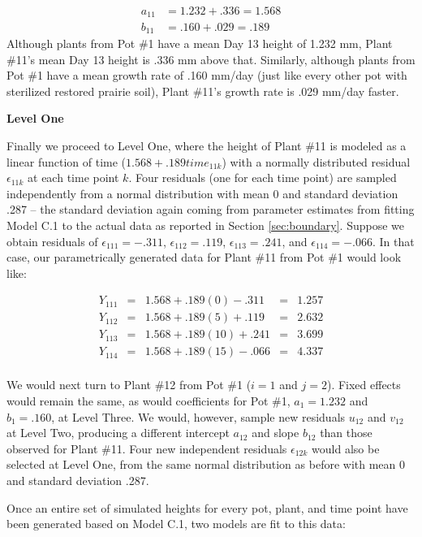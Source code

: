 \documentclass[
]{krantz}
\begin{document}
\begin{align*}
a_{11} & = 1.232+.336 = 1.568 \\
b_{11} & = .160+.029 = .189
\end{align*}
Although plants from Pot \#1 have a mean Day 13 height of 1.232 mm, Plant \#11's mean Day 13 height is .336 mm above that. Similarly, although plants from Pot \#1 have a mean growth rate of .160 mm/day (just like every other pot with sterilized restored prairie soil), Plant \#11's growth rate is .029 mm/day faster.

\textbf{Level One}

Finally we proceed to Level One, where the height of Plant \#11 is modeled as a linear function of time (\(1.568 + .189\textstyle{time}_{11k}\)) with a normally distributed residual \(\epsilon_{11k}\) at each time point \(k\). Four residuals (one for each time point) are sampled independently from a normal distribution with mean 0 and standard deviation .287 -- the standard deviation again coming from parameter estimates from fitting Model C.1 to the actual data as reported in Section \ref{sec:boundary}. Suppose we obtain residuals of \(\epsilon_{111}=-.311\), \(\epsilon_{112}=.119\), \(\epsilon_{113}=.241\), and \(\epsilon_{114}=-.066\). In that case, our parametrically generated data for Plant \#11 from Pot \#1 would look like:

\[ \begin{array}{rcccl}
   Y_{111} & = & 1.568+.189(0)-.311 & = & 1.257 \\
   Y_{112} & = & 1.568+.189(5)+.119 & = & 2.632 \\
   Y_{113} & = & 1.568+.189(10)+.241 & = & 3.699 \\
   Y_{114} & = & 1.568+.189(15)-.066 & = & 4.337 \\
   \end{array} \]

We would next turn to Plant \#12 from Pot \#1 (\(i=1\) and \(j=2\)). Fixed effects would remain the same, as would coefficients for Pot \#1, \(a_{1} = 1.232\) and \(b_{1} = .160\), at Level Three. We would, however, sample new residuals \(u_{12}\) and \(v_{12}\) at Level Two, producing a different intercept \(a_{12}\) and slope \(b_{12}\) than those observed for Plant \#11. Four new independent residuals \(\epsilon_{12k}\) would also be selected at Level One, from the same normal distribution as before with mean 0 and standard deviation .287.

Once an entire set of simulated heights for every pot, plant, and time point have been generated based on Model C.1, two models are fit to this data:
\end{document}
